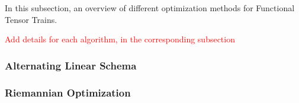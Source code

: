 \documentclass[11pt]{article}
\begin{document}
    In this subsection, an overview of different optimization methods for Functional Tensor Trains.

    \textcolor{red}{Add details for each algorithm, in the corresponding subsection}

    \subsubsection{Alternating Linear Schema}

    \subsubsection{Riemannian Optimization}
\end{document}

